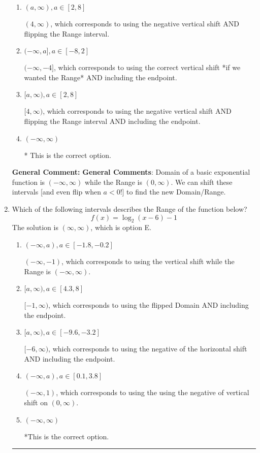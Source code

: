 \documentclass{extbook}[14pt]
\newcommand{\litem}[1]{\item #1

\rule{\textwidth}{0.4pt}}
\begin{document}
\begin{enumerate}
{\begin{enumerate}[label=\Alph*.]
$(-\infty, -4)$, which corresponds to using the correct vertical shift *if we wanted the Range*.
\item \( (a, \infty), a \in [2, 8] \)

$(4, \infty)$, which corresponds to using the negative vertical shift AND flipping the Range interval.
\item \( (-\infty, a], a \in [-8, 2] \)

$(-\infty, -4]$, which corresponds to using the correct vertical shift *if we wanted the Range* AND including the endpoint.
\item \( [a, \infty), a \in [2, 8] \)

$[4, \infty)$, which corresponds to using the negative vertical shift AND flipping the Range interval AND including the endpoint.
\item \( (-\infty, \infty) \)

* This is the correct option.
\end{enumerate}

\textbf{General Comment:} \textbf{General Comments}: Domain of a basic exponential function is $(-\infty, \infty)$ while the Range is $(0, \infty)$. We can shift these intervals [and even flip when $a<0$!] to find the new Domain/Range.
}
\litem{
Which of the following intervals describes the Range of the function below?
\[ f(x) = \log_2{(x-6)}-1 \]The solution is \( (\infty, \infty) \), which is option E.\begin{enumerate}[label=\Alph*.]
\item \( (-\infty, a), a \in [-1.8, -0.2] \)

$(-\infty, -1)$, which corresponds to using the vertical shift while the Range is $(-\infty, \infty)$.
\item \( [a, \infty), a \in [4.3, 8] \)

$[-1, \infty)$, which corresponds to using the flipped Domain AND including the endpoint.
\item \( [a, \infty), a \in [-9.6, -3.2] \)

$[-6, \infty)$, which corresponds to using the negative of the horizontal shift AND including the endpoint.
\item \( (-\infty, a), a \in [0.1, 3.8] \)

$(-\infty, 1)$, which corresponds to using the using the negative of vertical shift on $(0, \infty)$.
\item \( (-\infty, \infty) \)

*This is the correct option.
\end{enumerate}

}
\end{enumerate}
\end{document}
